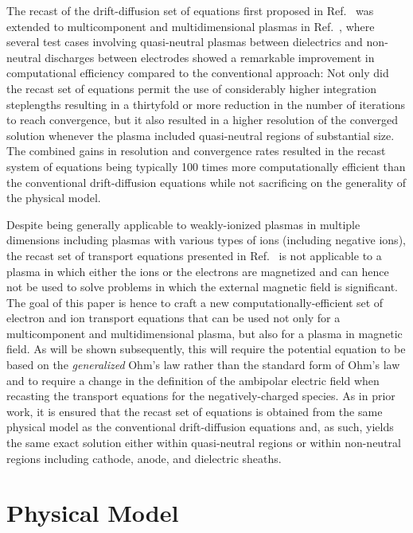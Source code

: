 \documentclass[twoside,onecolumn,10pt]{waflarticle}
\begin{document}
The recast of the drift-diffusion set of equations first proposed in Ref.\ \cite{jcp:2013:parent} was extended to multicomponent and multidimensional plasmas in Ref.\ \cite{jcp:2014:parent}, where several test cases involving quasi-neutral plasmas between dielectrics  and non-neutral discharges between electrodes showed a remarkable improvement in computational efficiency compared to the conventional approach: Not only did the recast set of equations permit the use of considerably higher integration steplengths  resulting in a thirtyfold or more reduction in the number of iterations to reach convergence, but it also resulted in a higher resolution of the converged solution whenever the plasma included quasi-neutral regions of substantial size. The combined gains in resolution and convergence rates resulted in the recast system of equations being typically 100 times more computationally efficient than the conventional drift-diffusion equations  while not sacrificing on the generality of the physical model.  

Despite being generally applicable to weakly-ionized plasmas in multiple dimensions including plasmas with various types of ions (including negative ions), the recast set of transport equations presented in Ref.\ \cite{jcp:2014:parent} is not applicable to a plasma in which either the ions or the electrons are magnetized and can hence not be used to solve problems in which the external magnetic field is significant. The goal of this paper is hence to craft a new computationally-efficient set of electron and ion transport equations that can be used not only for a multicomponent and multidimensional plasma, but also for a plasma in magnetic field. As will be shown subsequently, this will require the potential equation to be based on the \emph{generalized} Ohm's law rather than the standard form of Ohm's law and to require a change in the definition of the ambipolar electric field when recasting the transport equations for the negatively-charged species. As in prior work, it is ensured that the recast set of equations is obtained from the same physical model as the conventional drift-diffusion equations and, as such, yields the same exact solution either within quasi-neutral regions or within non-neutral regions including cathode, anode, and dielectric sheaths.            



\section{Physical Model}
\end{document}
